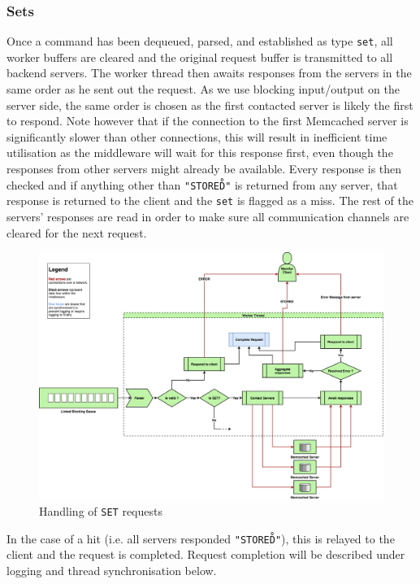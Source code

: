 \documentclass[11pt,a4paper]{article}
\begin{document}
\subsubsection{Sets}
Once a command has been dequeued, parsed, and established as type \texttt{set}, all worker buffers are cleared and the original request buffer is transmitted to all backend servers. The worker thread then awaits responses from the servers in the same order as he sent out the request. As we use blocking input/output on the server side, the same order is chosen as the first contacted server is likely the first to respond. Note however that if the connection to the first Memcached server is significantly slower than other connections, this will result in inefficient time utilisation as the middleware will wait for this response first, even though the responses from other servers might already be available. Every response is then checked and if anything other than \texttt{"STORED\r\n"} is returned from any server, that response is returned to the client and the \texttt{set} is flagged as a miss. The rest of the servers' responses are read in order to make sure all communication channels are cleared for the next request.
\begin{figure}[h]
    \centering
    \includegraphics[width=\textwidth]{processing/graphics/sets_handling.png}
    \caption{Handling of \texttt{SET} requests}
    \label{png::sets_handling}
\end{figure}
In the case of a hit (i.e. all servers responded \texttt{"STORED\r\n"}), this is relayed to the client and the request is completed. Request completion will be described under logging and thread synchronisation below.
\end{document}

